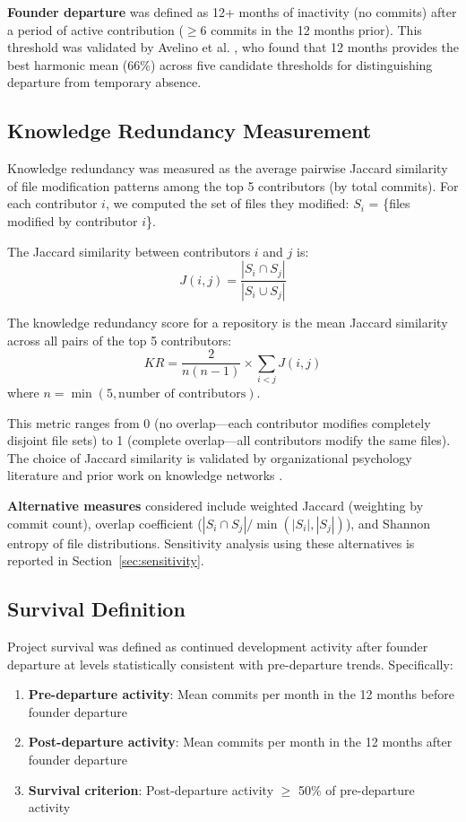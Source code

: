 \documentclass[11pt,letterpaper]{article}
\begin{document}
\textbf{Founder departure} was defined as 12+ months of inactivity (no commits) after a period of active contribution ($\geq$6 commits in the 12 months prior). This threshold was validated by Avelino et al. \cite{Avelino2019}, who found that 12 months provides the best harmonic mean (66\%) across five candidate thresholds for distinguishing departure from temporary absence.

\subsection{Knowledge Redundancy Measurement}

Knowledge redundancy was measured as the average pairwise Jaccard similarity of file modification patterns among the top 5 contributors (by total commits). For each contributor $i$, we computed the set of files they modified: $S_i$ = \{files modified by contributor $i$\}.

The Jaccard similarity between contributors $i$ and $j$ is:
\[J(i,j) = \frac{|S_i \cap S_j|}{|S_i \cup S_j|}\]

The knowledge redundancy score for a repository is the mean Jaccard similarity across all pairs of the top 5 contributors:
\[KR = \frac{2}{n(n-1)} \times \sum_{i<j} J(i,j)\]
where $n = \min(5, \text{number of contributors})$.

This metric ranges from 0 (no overlap---each contributor modifies completely disjoint file sets) to 1 (complete overlap---all contributors modify the same files). The choice of Jaccard similarity is validated by organizational psychology literature \cite{Cooke2000} and prior work on knowledge networks \cite{Linstead2017}.

\textbf{Alternative measures} considered include weighted Jaccard (weighting by commit count), overlap coefficient ($|S_i \cap S_j| / \min(|S_i|, |S_j|)$), and Shannon entropy of file distributions. Sensitivity analysis using these alternatives is reported in Section~\ref{sec:sensitivity}.

\subsection{Survival Definition}

Project survival was defined as continued development activity after founder departure at levels statistically consistent with pre-departure trends. Specifically:

\begin{enumerate}
    \item \textbf{Pre-departure activity}: Mean commits per month in the 12 months before founder departure
    \item \textbf{Post-departure activity}: Mean commits per month in the 12 months after founder departure
    \item \textbf{Survival criterion}: Post-departure activity $\geq$ 50\% of pre-departure activity
\end{enumerate}
\end{document}

